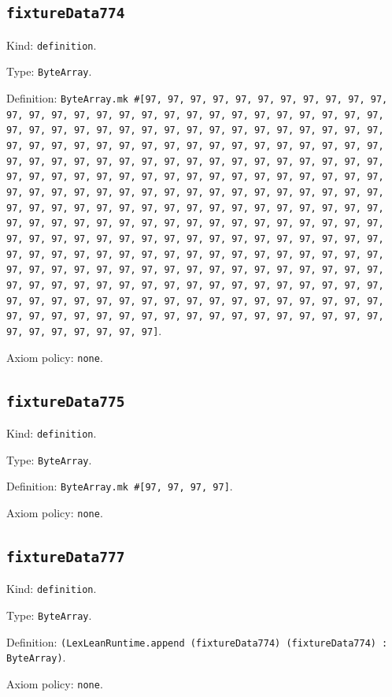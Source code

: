 \documentclass[11pt]{article}
\begin{document}
\subsection*{\texttt{fixtureData774}}
\noindent Kind: \texttt{definition}.\par
\noindent Type: \texttt{ByteArray}.\par
\noindent Definition: \texttt{ByteArray.mk \#[97, 97, 97, 97, 97, 97, 97, 97, 97, 97, 97, 97, 97, 97, 97, 97, 97, 97, 97, 97, 97, 97, 97, 97, 97, 97, 97, 97, 97, 97, 97, 97, 97, 97, 97, 97, 97, 97, 97, 97, 97, 97, 97, 97, 97, 97, 97, 97, 97, 97, 97, 97, 97, 97, 97, 97, 97, 97, 97, 97, 97, 97, 97, 97, 97, 97, 97, 97, 97, 97, 97, 97, 97, 97, 97, 97, 97, 97, 97, 97, 97, 97, 97, 97, 97, 97, 97, 97, 97, 97, 97, 97, 97, 97, 97, 97, 97, 97, 97, 97, 97, 97, 97, 97, 97, 97, 97, 97, 97, 97, 97, 97, 97, 97, 97, 97, 97, 97, 97, 97, 97, 97, 97, 97, 97, 97, 97, 97, 97, 97, 97, 97, 97, 97, 97, 97, 97, 97, 97, 97, 97, 97, 97, 97, 97, 97, 97, 97, 97, 97, 97, 97, 97, 97, 97, 97, 97, 97, 97, 97, 97, 97, 97, 97, 97, 97, 97, 97, 97, 97, 97, 97, 97, 97, 97, 97, 97, 97, 97, 97, 97, 97, 97, 97, 97, 97, 97, 97, 97, 97, 97, 97, 97, 97, 97, 97, 97, 97, 97, 97, 97, 97, 97, 97, 97, 97, 97, 97, 97, 97, 97, 97, 97, 97, 97, 97, 97, 97, 97, 97, 97, 97, 97, 97, 97, 97, 97, 97, 97, 97, 97, 97, 97, 97, 97, 97, 97, 97, 97, 97, 97, 97, 97, 97, 97, 97, 97, 97, 97, 97, 97, 97, 97, 97, 97, 97]}.\par
\noindent Axiom policy: \texttt{none}.\par
\subsection*{\texttt{fixtureData775}}
\noindent Kind: \texttt{definition}.\par
\noindent Type: \texttt{ByteArray}.\par
\noindent Definition: \texttt{ByteArray.mk \#[97, 97, 97, 97]}.\par
\noindent Axiom policy: \texttt{none}.\par
\subsection*{\texttt{fixtureData777}}
\noindent Kind: \texttt{definition}.\par
\noindent Type: \texttt{ByteArray}.\par
\noindent Definition: \texttt{(LexLeanRuntime.append (fixtureData774) (fixtureData774) : ByteArray)}.\par
\noindent Axiom policy: \texttt{none}.\par
\end{document}
